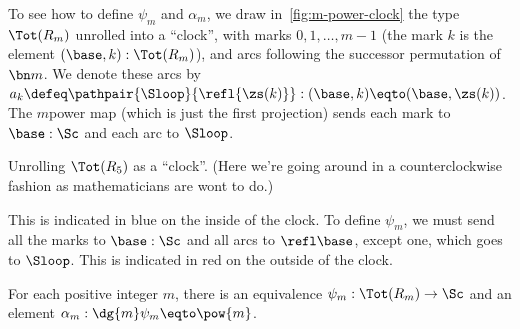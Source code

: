 To see how to define $\psi_m$ and $\alpha_m$,
we draw in~\cref{fig:m-power-clock} the type $\Tot(R_m)$
unrolled into a ``clock'', with marks $0,1,\dots,m-1$
(the mark $k$ is the element $(\base,k):\Tot(R_m)$),
and arcs following the successor permutation of $\bn m$.
We denote these arcs by 
$a_k \defeq \pathpair{\Sloop}{\refl{\zs(k)}} : (\base,k) \eqto (\base,\zs(k))$.
The $m$\th power map (which is just the first projection)
sends each mark to $\base:\Sc$ and each arc to $\Sloop$.
\begin{marginfigure}
  \caption{Unrolling $\protect\Tot(R_5)$ as a ``clock''. (Here we're going around in a counterclockwise fashion as mathematicians are wont to do.)}
  \label{fig:m-power-clock}
\end{marginfigure}
This is indicated in blue on the inside of the clock.
To define $\psi_m$, we must send all the marks to $\base:\Sc$
and all arcs to $\refl\base$, except one, which goes to $\Sloop$.
This is indicated in red on the outside of the clock.
\begin{construction}\label{con:psi-alpha-m}
  For each positive integer $m$,
  there is an equivalence $\psi_m : \Tot(R_m) \to \Sc$
  and an element $\alpha_m : \dg{m}\psi_m \eqto \pow{m}$.
\end{construction}
